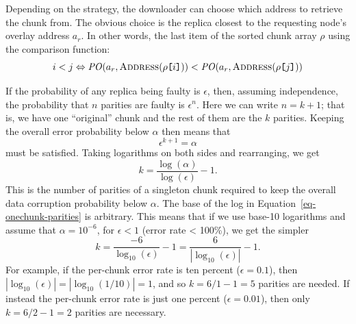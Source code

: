 \documentclass[manuscript,screen,review]{acmart}
\newcommand{\idx}[1]{\texttt{[}\/#1\/\texttt{]}}
\begin{document}
Depending on the strategy, the downloader can choose which  address to retrieve the chunk from. The obvious choice is the replica closest to the requesting node's overlay address $a_r$. In other words, the last item of the sorted chunk array $\rho$ using the comparison function:
\begin{equation}
  i<j\Leftrightarrow    	
  \mathit{PO}(a_r,
  \textsc{Address}(\rho\idx{i}))
  <\mathit{PO}(a_r,
  \textsc{Address}(\rho\idx{j}))
\end{equation}



If the probability of any replica being faulty is $\epsilon$, then, assuming independence, the probability that $n$ parities are faulty is $\epsilon^n$. Here we can write $n = k + 1$; that is, we have one ``original'' chunk and the rest of them are the $k$ parities. Keeping the overall error probability below $\alpha$ then means that
\begin{equation}
  \epsilon^{k+1} = \alpha
  \label{eq-onechunk}
\end{equation}
must be satisfied. Taking logarithms on both sides and rearranging, we get
\begin{equation}
  k = \frac{\log(\alpha)}{\log(\epsilon)} - 1 .
  \label{eq-onechunk-parities}
\end{equation}
This is the number of parities of a singleton chunk required to keep the overall data corruption probability below $\alpha$. The base of the log in Equation~\ref{eq-onechunk-parities} is arbitrary. This means that if we use base-10 logarithms and assume that $\alpha = 10^{-6}$, for $\epsilon < 1$ (error rate < 100\%), we get the simpler
\begin{equation}
  k  = \frac{-6}{\log_{10}(\epsilon)} - 1 = \frac{6}{|\log_{10}(\epsilon)|} - 1 .
  \label{eq-onechunk-special}
\end{equation}
For example, if the per-chunk error rate is ten percent ($\epsilon = 0.1$), then $|\log_{10}(\epsilon)| = |\log_{10}(1/10)| = 1$, and so $k = 6/1 - 1 = 5$ parities are needed. If instead the per-chunk error rate is just one percent ($\epsilon = 0.01$), then only $k = 6/2 - 1 = 2$ parities are necessary.
\end{document}
